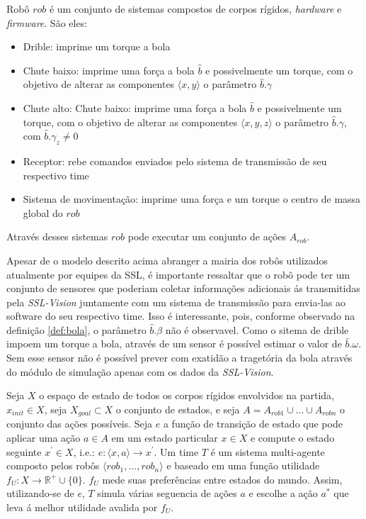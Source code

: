 \begin{defi}[Robô]
  Robô $rob$ é um conjunto de sistemas compostos de corpos rígidos,
  \textit{hardware} e \textit{firmware}. São eles:
  
  \begin{itemize}
    \item Drible: imprime um torque a bola
    \item Chute baixo: imprime uma força a bola $\hat{b}$
          e possivelmente um torque, com o objetivo de
          alterar as componentes $\langle x,y \rangle$
          o parâmetro $\hat{b}.\gamma$ 
    \item Chute alto: Chute baixo: imprime uma força a bola $\hat{b}$
          e possivelmente um torque, com o objetivo de
          alterar as componentes $\langle x,y,z \rangle$
          o parâmetro $\hat{b}.\gamma$, com $\hat{b}.\gamma_z \neq 0$
    \item Receptor: rebe comandos enviados pelo sistema de
          transmissão de seu respectivo time
    \item Sistema de movimentação: imprime uma força e um torque
          o centro de massa global do $rob$
  \end{itemize}  
  
  Através desses sistemas $rob$ pode executar um conjunto de ações $A_{rob}$.
  
  Apesar de o modelo descrito acima abranger a mairia dos
  robôs utilizados atualmente por equipes da SSL, é importante
  ressaltar que o robô pode ter um conjunto de sensores que
  poderiam coletar informações adicionais ás transmitidas pela
  \textit{SSL-Vision} juntamente com um sistema de transmissão
  para envia-las ao software do seu respectivo time. Isso é
  interessante, pois, conforme observado na definição \ref{def:bola},
  o parâmetro $\hat{b}.\beta$ não é observavel. Como o sitema de
  drible impoem um torque a bola, através de um sensor é possível
  estimar o valor de $\hat{b}.\omega$. Sem esse sensor não é possível
  prever com exatidão a tragetória da bola através do módulo de
  simulação apenas com os dados da \textit{SSL-Vision}.
  
\end{defi}

\begin{defi}[Time]
  Seja $X$ o espaço de estado de todos os corpos rígidos envolvidos na partida,
  $x_{init} \in X$, seja $X_{goal}\subset X$ o conjunto de estados, e seja $A = A_{rob 1} 
  \cup ... \cup A_{rob n}$ o conjunto das ações possíveis. Seja $e$ a função de transição
  de estado que pode aplicar uma ação $a\in A$ em um estado particular
  $x \in X$ e compute o estado seguinte $x^{'} \in X$, i.e.: 
  $e: \langle x,a \rangle \longrightarrow x^{'}$.
  Um time $T$ é um sistema multi-agente composto pelos robôs 
  $\langle rob_1, ..., rob_n \rangle$ e baseado em uma função utilidade
  $f_{U}: X \longrightarrow \mathbb{R^{+}} \cup\lbrace 0\rbrace$.
  $f_{U}$ mede suas preferências entre estados do mundo. Assim, utilizando-se
  de $e$, $T$ simula várias seguencia de ações $a$ e escolhe a ação $a^{*}$ que
  leva á melhor utilidade avalida por $f_{U}$. 
\end{defi}